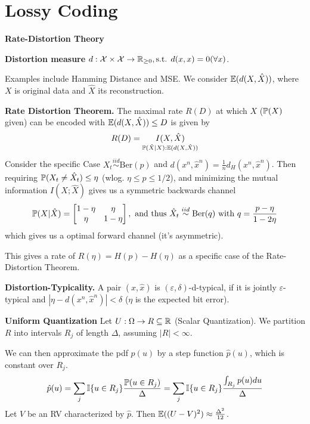 \section{Lossy Coding}
\textbf{Rate-Distortion Theory}

\textbf{Distortion measure} 
\(d: \mathcal{X} \times \mathcal{X} \to \R_{\geq 0}, \text{s.t. } d(x, x) = 0 (\forall x)\).

Examples include Hamming Distance and MSE. 
We consider \(\E(d(X, \hat{X}))\), where \(X\) is original data and \(\hat{X}\) its reconstruction. 

\textbf{Rate Distortion Theorem.}
The maximal rate \(R(D)\) at which \(X\) (\(\P(X)\) given) can 
be encoded with  \(\E(d(X, \hat{X})) \leq D\) is given by
\[R(D) = \underset{\P(\hat{X}|X): \E(d(X, \hat{X}))}{I(X, \hat{X})}\]
Consider the specific Case \(X_t \overset{iid}{\sim} \text{Ber}(p)\) and \(d(x^n, \hat{x}^n) = \frac{1}{n}d_H(x^n, \hat{x}^n)\).
Then requiring \(\P(X_t \neq \hat{X}_t) \leq \eta\) (wlog. \(\eta \leq p\leq 1/2\)), 
and minimizing the mutual information \(I(X;\hat{X})\) gives us a symmetric backwards channel 
\[\P(X|\hat{X}) = \left[\begin{matrix}
    1-\eta & \eta\\
    \eta & 1-\eta
\end{matrix}\right], \text{ and thus } \hat{X}_t \overset{iid}{\sim} \text{Ber}(q) \text{ with } q = \frac{p - \eta}{1-2\eta} \]
which gives us a optimal forward channel (it's asymmetric).

This gives a rate of \(R(\eta) = H(p) - H(\eta)\) as a specific case of the Rate-Distortion Theorem.

\textbf{Distortion-Typicality.} A pair \((x, \hat{x})\) is \((\varepsilon, \delta)\)-d-typical, 
if it is jointly \(\varepsilon\)-typical and \(|\eta - d(x^n, \hat{x}^n)| < \delta\) (\(\eta\) is the expected bit error).

\vspace*{1mm}
\textbf{Uniform Quantization}
Let \(U: \Omega \to R \subseteq \R\) (Scalar Quantization). 
We partition \(R\) into intervals \(R_j\) of length \(\Delta\), assuming \(|R| < \infty\).

We can then approximate the pdf \(p(u)\) by a step function \(\hat{p}(u)\), which is constant over \(R_j\).
\[\hat{p}(u) = \sum_{j}\mathbb{I}\{u \in R_j\} \frac{\P(u \in R_j)}{\Delta} 
= \sum_{j}\mathbb{I}\{u \in R_j\} \frac{\int_{R_j}p(u)du}{\Delta}\]
Let \(V\) be an RV characterized by \(\hat{p}\). Then \(\E((U-V)^2) \approx \frac{\Delta^2}{12}\).

